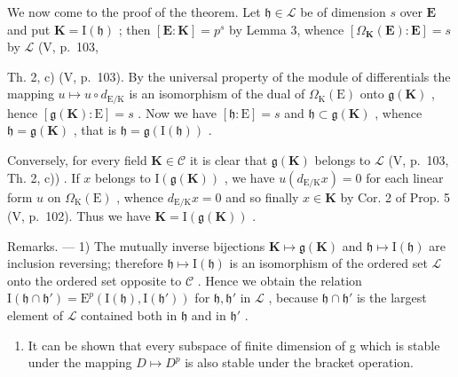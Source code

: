 We now come to the proof of the theorem. Let \(\mathfrak{h} \in \mathcal{L}\) be of dimension \(s\) over \(\mathbf{E}\) and put \(\mathbf{K} = \mathrm{I}(\mathfrak{h})\) ; then \([\mathbf{E}:\mathbf{K}] = p^s\) by Lemma 3, whence \([\Omega_{\mathbf{K}}(\mathbf{E}):\mathbf{E}] = s\) by \(\mathcal{L}\) (V, p.~103,

Th. 2, c) (V, p.~103). By the universal property of the module of differentials the mapping \(u \mapsto u \circ d_{\mathrm{E} / \mathrm{K}}\) is an isomorphism of the dual of \(\Omega_{\mathrm{K}}(\mathrm{E})\) onto \(\mathfrak{g}(\mathbf{K})\) , hence \([\mathfrak{g}(\mathbf{K}) : \mathrm{E}] = s\) . Now we have \([\mathfrak{h} : \mathrm{E}] = s\) and \(\mathfrak{h} \subset \mathfrak{g}(\mathbf{K})\) , whence \(\mathfrak{h} = \mathfrak{g}(\mathbf{K})\) , that is \(\mathfrak{h} = \mathfrak{g}(\mathrm{I}(\mathfrak{h}))\) .

Conversely, for every field \(\mathbf{K} \in \mathcal{C}\) it is clear that \(\mathfrak{g}(\mathbf{K})\) belongs to \(\mathcal{L}\) (V, p.~103, Th. 2, c)) . If \(x\) belongs to \(\mathrm{I}(\mathfrak{g}(\mathbf{K}))\) , we have \(u(d_{\mathrm{E/K}} x) = 0\) for each linear form \(u\) on \(\Omega_{\mathrm{K}}(\mathrm{E})\) , whence \(d_{\mathrm{E/K}} x = 0\) and so finally \(x \in \mathbf{K}\) by Cor. 2 of Prop. 5 (V, p.~102). Thus we have \(\mathbf{K} = \mathrm{I}(\mathfrak{g}(\mathbf{K}))\) .

Remarks. --- 1) The mutually inverse bijections \(\mathbf{K} \mapsto \mathfrak{g}(\mathbf{K})\) and \(\mathfrak{h} \mapsto \mathrm{I}(\mathfrak{h})\) are inclusion reversing; therefore \(\mathfrak{h} \mapsto \mathrm{I}(\mathfrak{h})\) is an isomorphism of the ordered set \(\mathcal{L}\) onto the ordered set opposite to \(\mathcal{C}\) . Hence we obtain the relation \(\mathrm{I}(\mathfrak{h} \cap \mathfrak{h}') = \mathrm{E}^p(\mathrm{I}(\mathfrak{h}), \mathrm{I}(\mathfrak{h}'))\) for \(\mathfrak{h}, \mathfrak{h}'\) in \(\mathcal{L}\) , because \(\mathfrak{h} \cap \mathfrak{h}'\) is the largest element of \(\mathcal{L}\) contained both in \(\mathfrak{h}\) and in \(\mathfrak{h}'\) .

\begin{enumerate}
\def\labelenumi{\arabic{enumi})}
\setcounter{enumi}{1}
\tightlist
\item
  It can be shown that every subspace of finite dimension of g which is stable under the mapping \(D \mapsto D^{p}\) is also stable under the bracket operation.
\end{enumerate}

